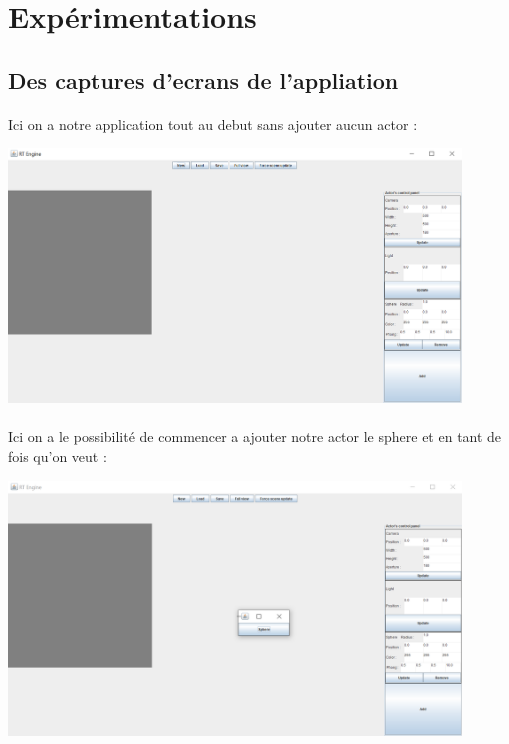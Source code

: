 \documentclass[12pt]{article}
\begin{document}
	\section{Expérimentations}

		\subsection{Des captures d'ecrans de l'appliation}
		\paragraph{}
            Ici on a notre application tout au debut sans ajouter aucun actor :
		    \begin{center}
	    	\includegraphics[width=0.9\textwidth]{./images/debut.png}
			\end{center}
			
		\paragraph{}
            Ici on a le possibilité de commencer a ajouter notre actor le sphere et en tant de fois qu'on veut  :
		        \begin{center}
	    	    \includegraphics[width=0.9\textwidth]{./images/buttonsphere.png}
			    \end{center}
		\newpage
\end{document}
